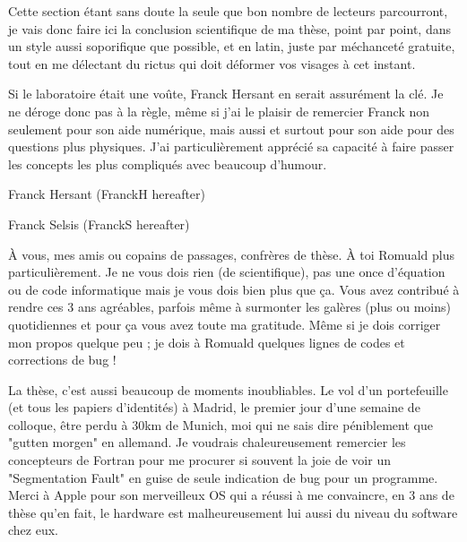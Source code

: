 Cette section étant sans doute la seule que bon nombre de lecteurs parcourront, je vais donc faire ici la conclusion scientifique de ma thèse, point par point, dans un style aussi soporifique que possible, et en latin, juste par méchanceté gratuite, tout en me délectant du rictus qui doit déformer vos visages à cet instant. 




Si le laboratoire était une voûte, Franck Hersant en serait assurément la clé. Je ne déroge donc pas à la règle, même si j'ai le plaisir de remercier Franck non seulement pour son aide numérique, mais aussi et surtout pour son aide pour des questions plus physiques. J'ai particulièrement apprécié sa capacité à faire passer les concepts les plus compliqués avec beaucoup d'humour.

Franck Hersant (FranckH hereafter)


Franck Selsis (FranckS hereafter)


À vous, mes amis ou copains de passages, confrères de thèse. À toi Romuald plus particulièrement. Je ne vous dois rien (de scientifique), pas une once d'équation ou de code informatique mais je vous dois bien plus que ça. Vous avez contribué à rendre ces 3 ans agréables, parfois même à surmonter les galères (plus ou moins) quotidiennes et pour ça vous avez toute ma gratitude. Même si je dois corriger mon propos quelque peu ; je dois à Romuald quelques lignes de codes et corrections de bug !


La thèse, c'est aussi beaucoup de moments inoubliables. Le vol d'un portefeuille (et tous les papiers d'identités) à Madrid, le premier jour d'une semaine de colloque, être perdu à 30km de Munich, moi qui ne sais dire péniblement que "gutten morgen" en allemand. Je voudrais chaleureusement remercier les concepteurs de Fortran pour me procurer si souvent la joie de voir un "Segmentation Fault" en guise de seule indication de bug pour un programme. Merci à Apple pour son merveilleux OS qui a réussi à me convaincre, en 3 ans de thèse qu'en fait, le hardware est malheureusement lui aussi du niveau du software chez eux. 

